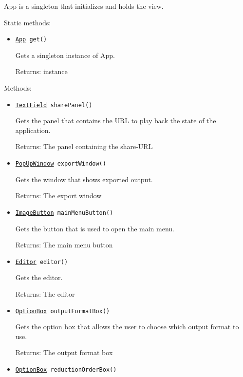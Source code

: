 App is a singleton that initializes and holds the view.

Static methods:
\begin{itemize}
\item \texttt{\hyperref[type:edu.kit.wavelength.client.view.App]{App} get()}

Gets a singleton instance of App.

Returns: instance

\end{itemize}

Methods:
\begin{itemize}
\item \texttt{\hyperref[type:edu.kit.wavelength.client.view.webui.component.TextField]{TextField} sharePanel()}

Gets the panel that contains the URL to play back the state of the application.

Returns: The panel containing the share-URL

\item \texttt{\hyperref[type:edu.kit.wavelength.client.view.webui.component.PopUpWindow]{PopUpWindow} exportWindow()}

Gets the window that shows exported output.

Returns: The export window

\item \texttt{\hyperref[type:edu.kit.wavelength.client.view.webui.component.ImageButton]{ImageButton} mainMenuButton()}

Gets the button that is used to open the main menu.

Returns: The main menu button

\item \texttt{\hyperref[type:edu.kit.wavelength.client.view.webui.component.Editor]{Editor} editor()}

Gets the editor.

Returns: The editor

\item \texttt{\hyperref[type:edu.kit.wavelength.client.view.webui.component.OptionBox]{OptionBox} outputFormatBox()}

Gets the option box that allows the user to choose which output format to use.

Returns: The output format box

\item \texttt{\hyperref[type:edu.kit.wavelength.client.view.webui.component.OptionBox]{OptionBox} reductionOrderBox()}


\end{itemize}
